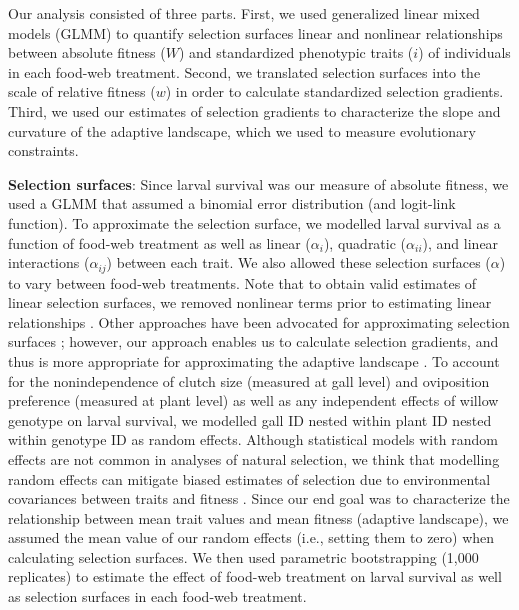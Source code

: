 \documentclass[11pt,]{article}
\begin{document}
Our analysis consisted of three parts. First, we used generalized linear
mixed models (GLMM) to quantify selection surfaces \textemdash linear
and nonlinear relationships between absolute fitness (\(W\)) and
standardized phenotypic traits (\(i\)) of individuals \textemdash in
each food-web treatment. Second, we translated selection surfaces into
the scale of relative fitness (\(w\)) in order to calculate standardized
selection gradients. Third, we used our estimates of selection gradients
to characterize the slope and curvature of the adaptive landscape, which
we used to measure evolutionary constraints.

\textbf{Selection surfaces}: Since larval survival was our measure of
absolute fitness, we used a GLMM that assumed a binomial error
distribution (and logit-link function). To approximate the selection
surface, we modelled larval survival as a function of food-web treatment
as well as linear (\(\alpha_i\)), quadratic (\(\alpha_{ii}\)), and
linear interactions (\(\alpha_{ij}\)) between each trait. We also
allowed these selection surfaces (\(\alpha\)) to vary between food-web
treatments. Note that to obtain valid estimates of linear selection
surfaces, we removed nonlinear terms prior to estimating linear
relationships \citep{Lande1983}. Other approaches have been advocated
for approximating selection surfaces \citep{Schluter1988}; however, our
approach enables us to calculate selection gradients, and thus is more
appropriate for approximating the adaptive landscape \citep{Arnold2003}.
To account for the nonindependence of clutch size (measured at gall
level) and oviposition preference (measured at plant level) as well as
any independent effects of willow genotype on larval survival, we
modelled gall ID nested within plant ID nested within genotype ID as
random effects. Although statistical models with random effects are not
common in analyses of natural selection, we think that modelling random
effects can mitigate biased estimates of selection due to environmental
covariances between traits and fitness \citep{Rausher1992}. Since our
end goal was to characterize the relationship between mean trait values
and mean fitness (adaptive landscape), we assumed the mean value of our
random effects (i.e., setting them to zero) when calculating selection
surfaces. We then used parametric bootstrapping (1,000 replicates) to
estimate the effect of food-web treatment on larval survival as well as
selection surfaces in each food-web treatment.
\end{document}
